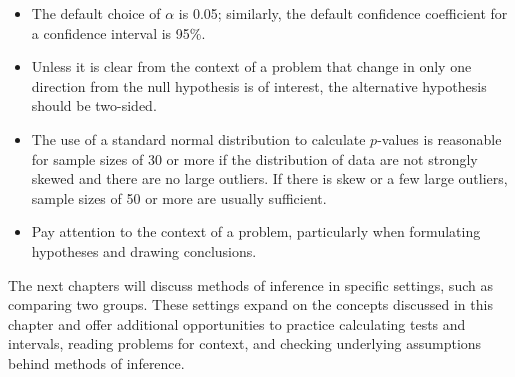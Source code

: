 \begin{itemize}
	\item The default choice of $\alpha$ is 0.05; similarly, the default confidence coefficient for a confidence interval is 95\%. 
	
	\item Unless it is clear from the context of a problem that change in only one direction from the null hypothesis is of interest, the alternative hypothesis should be two-sided.
	
	\item The use of a standard normal distribution to calculate $p$-values is reasonable for sample sizes of 30 or more if the distribution of data are not strongly skewed and there are no large outliers. If there is skew or a few large outliers, sample sizes of 50 or more are usually sufficient.
	
	\item Pay attention to the context of a problem, particularly when formulating hypotheses and drawing conclusions.
\end{itemize}

The next chapters will discuss methods of inference in specific settings, such as comparing two groups. These settings expand on the concepts discussed in this chapter and offer additional opportunities to practice calculating tests and intervals, reading problems for context, and checking underlying assumptions behind methods of inference.
